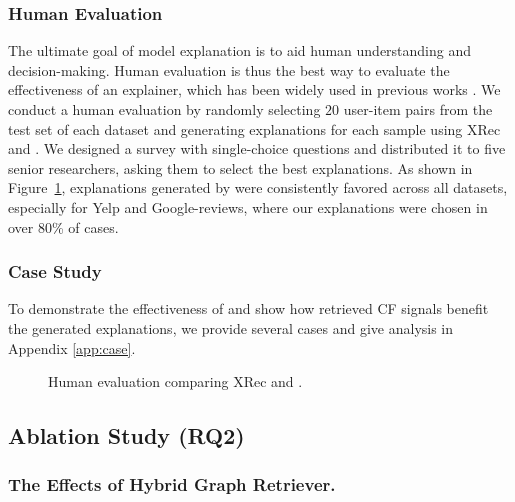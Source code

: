 \subsubsection{Human Evaluation} The ultimate goal of model explanation is to aid human understanding and decision-making. Human evaluation is thus the best way to evaluate the effectiveness of an explainer, which has been widely used in previous works \cite{ribeiro2016should,ghazimatin2020prince}. We conduct a human evaluation by randomly selecting $20$ user-item pairs from the test set of each dataset and generating explanations for each sample using XRec \cite{ma2024xrec} and \model. We designed a survey with single-choice questions and distributed it to five senior researchers, asking them to select the best explanations. As shown in Figure~\ref{fig:human}, explanations generated by \model were consistently favored across all datasets, especially for Yelp and Google-reviews, where our explanations were chosen in over 80\% of cases.

\subsubsection{Case Study} To demonstrate the effectiveness of \model and show how retrieved CF signals benefit the generated explanations, we provide several cases and give analysis in Appendix \ref{app:case}.

\begin{figure}[t]
    \centering
    \vspace{-6mm}
    \caption{Human evaluation comparing XRec and \model.} 
    \label{fig:human}
    \vspace{-3mm}
\end{figure}



\subsection{Ablation Study (RQ2)}
\label{subsec:ablation}


\subsubsection{The Effects of Hybrid Graph Retriever.} 

